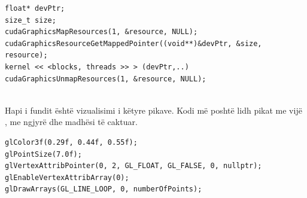\begin{lstlisting}
float* devPtr;
size_t size;
cudaGraphicsMapResources(1, &resource, NULL);
cudaGraphicsResourceGetMappedPointer((void**)&devPtr, &size, resource);
kernel << <blocks, threads >> > (devPtr,..)
cudaGraphicsUnmapResources(1, &resource, NULL);
\end{lstlisting}

\noindent \\ Hapi i fundit është vizualisimi i këtyre pikave. Kodi më poshtë lidh pikat me vijë , me ngjyrë dhe madhësi të caktuar. \\
\begin{lstlisting}
glColor3f(0.29f, 0.44f, 0.55f);
glPointSize(7.0f);
glVertexAttribPointer(0, 2, GL_FLOAT, GL_FALSE, 0, nullptr);
glEnableVertexAttribArray(0);
glDrawArrays(GL_LINE_LOOP, 0, numberOfPoints);
\end{lstlisting}


